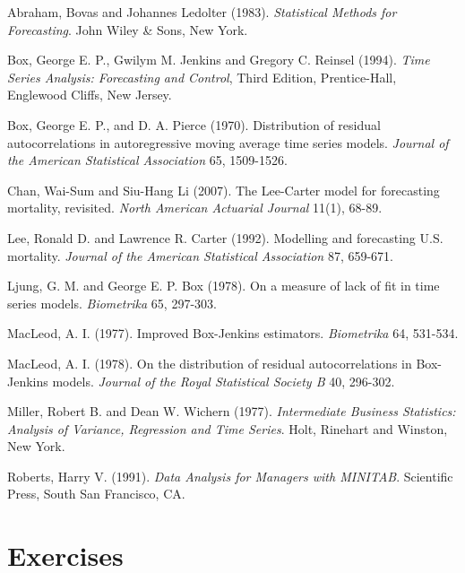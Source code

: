 \begin{multicols}{2}


Abraham, Bovas and  Johannes Ledolter (1983). \textit{Statistical
Methods for Forecasting}. John Wiley \& Sons, New York.

Box, George E. P., Gwilym M. Jenkins and Gregory C. Reinsel (1994).
\textit{Time Series Analysis: Forecasting and Control}, Third
Edition, Prentice-Hall, Englewood Cliffs, New Jersey.

Box, George E. P., and D. A. Pierce (1970). Distribution of residual
autocorrelations in autoregressive moving average time series
models. \textit{Journal of the American Statistical Association} 65,
1509-1526.

Chan, Wai-Sum and Siu-Hang Li (2007). The Lee-Carter model for
forecasting mortality, revisited. \textit{North American Actuarial
Journal} 11(1), 68-89.

Lee, Ronald D. and Lawrence R. Carter (1992). Modelling and
forecasting U.S. mortality. \textit{Journal of the American
Statistical Association} 87, 659-671.

Ljung, G. M. and George E. P. Box (1978). On a measure of lack of
fit in time series models. \textit{Biometrika} 65, 297-303.

MacLeod, A. I. (1977). Improved Box-Jenkins estimators.
\textit{Biometrika} 64, 531-534.

MacLeod, A. I. (1978). On the distribution of residual
autocorrelations in Box-Jenkins models. \textit{Journal of the Royal
Statistical Society B} 40, 296-302.

Miller, Robert B. and Dean W. Wichern (1977). \emph{Intermediate
Business Statistics: Analysis of Variance, Regression and Time
Series}. Holt, Rinehart and Winston, New York.

Roberts, Harry V. (1991). \emph{Data Analysis for Managers with
MINITAB}. Scientific Press, South San Francisco, CA.


\end{multicols}

\section{Exercises}


